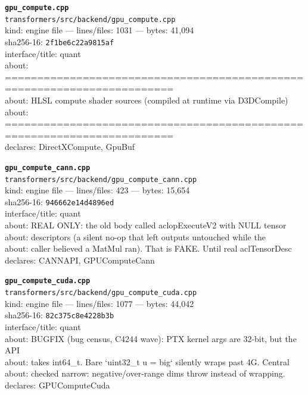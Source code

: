 \noindent\textbf{\texttt{gpu\_compute.cpp}}\\
\texttt{transformers/src/backend/gpu\_compute.cpp}\\
kind: engine file --- lines/files: 1031 --- bytes: 41,094\\
sha256-16: \texttt{2f1be6c22a9815af}\\
interface/title: quant\\
about: ========================================================================\\
about: HLSL compute shader sources (compiled at runtime via D3DCompile)\\
about: ========================================================================\\
declares: DirectXCompute, GpuBuf\\
\vspace*{6.0pt}

\noindent\textbf{\texttt{gpu\_compute\_cann.cpp}}\\
\texttt{transformers/src/backend/gpu\_compute\_cann.cpp}\\
kind: engine file --- lines/files: 423 --- bytes: 15,654\\
sha256-16: \texttt{946662e14d4896ed}\\
interface/title: quant\\
about: REAL ONLY: the old body called aclopExecuteV2 with NULL tensor\\
about: descriptors (a silent no-op that left outputs untouched while the\\
about: caller believed a MatMul ran). That is FAKE. Until real aclTensorDesc\\
declares: CANNAPI, GPUComputeCann\\
\vspace*{6.0pt}

\noindent\textbf{\texttt{gpu\_compute\_cuda.cpp}}\\
\texttt{transformers/src/backend/gpu\_compute\_cuda.cpp}\\
kind: engine file --- lines/files: 1077 --- bytes: 44,042\\
sha256-16: \texttt{82c375c8e4228b3b}\\
interface/title: quant\\
about: BUGFIX (bug census, C4244 wave): PTX kernel args are 32-bit, but the API\\
about: takes int64\_t. Bare `uint32\_t u = big` silently wraps past 4G. Central\\
about: checked narrow: negative/over-range dims throw instead of wrapping.\\
declares: GPUComputeCuda\\
\vspace*{6.0pt}
\newpage

